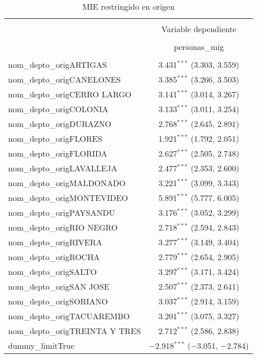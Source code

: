 
\begin{table}[H] \centering 
  \caption{MIE restringido en origen} 
  \label{} 
\begin{tabular}{@{\extracolsep{5pt}}lc} 
\\[-1.8ex]\hline 
\hline \\[-1.8ex] 
 & \multicolumn{1}{c}{Variable dependiente} \\ 
\cline{2-2} 
\\[-1.8ex] & personas\_mig \\ 
\hline \\[-1.8ex] 
 nom\_depto\_origARTIGAS & 3.431$^{***}$ (3.303, 3.559) \\ 
  nom\_depto\_origCANELONES & 3.385$^{***}$ (3.266, 3.503) \\ 
  nom\_depto\_origCERRO LARGO & 3.141$^{***}$ (3.014, 3.267) \\ 
  nom\_depto\_origCOLONIA & 3.133$^{***}$ (3.011, 3.254) \\ 
  nom\_depto\_origDURAZNO & 2.768$^{***}$ (2.645, 2.891) \\ 
  nom\_depto\_origFLORES & 1.921$^{***}$ (1.792, 2.051) \\ 
  nom\_depto\_origFLORIDA & 2.627$^{***}$ (2.505, 2.748) \\ 
  nom\_depto\_origLAVALLEJA & 2.477$^{***}$ (2.353, 2.600) \\ 
  nom\_depto\_origMALDONADO & 3.221$^{***}$ (3.099, 3.343) \\ 
  nom\_depto\_origMONTEVIDEO & 5.891$^{***}$ (5.777, 6.005) \\ 
  nom\_depto\_origPAYSANDU & 3.176$^{***}$ (3.052, 3.299) \\ 
  nom\_depto\_origRIO NEGRO & 2.718$^{***}$ (2.594, 2.843) \\ 
  nom\_depto\_origRIVERA & 3.277$^{***}$ (3.149, 3.404) \\ 
  nom\_depto\_origROCHA & 2.779$^{***}$ (2.654, 2.905) \\ 
  nom\_depto\_origSALTO & 3.297$^{***}$ (3.171, 3.424) \\ 
  nom\_depto\_origSAN JOSE & 2.507$^{***}$ (2.373, 2.641) \\ 
  nom\_depto\_origSORIANO & 3.037$^{***}$ (2.914, 3.159) \\ 
  nom\_depto\_origTACUAREMBO & 3.201$^{***}$ (3.075, 3.327) \\ 
  nom\_depto\_origTREINTA Y TRES & 2.712$^{***}$ (2.586, 2.838) \\ 
  dummy\_limitTrue & $-$2.918$^{***}$ ($-$3.051, $-$2.784) \\ 

\end{tabular}
\end{table}
